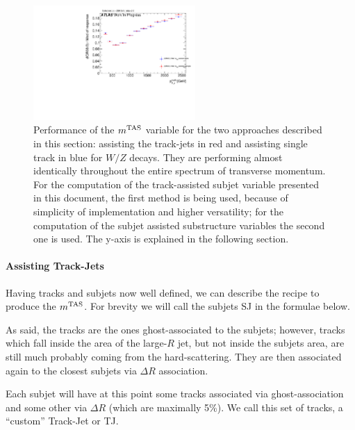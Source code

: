 \begin{figure}[!ht]
  \centering
      \includegraphics[width=0.55\textwidth]{jet_part/71graphcftr_h_JetRatio_mJ12CALOIQRoMwsecondApproach.pdf}
  \caption[Equivalence of approaches]{Performance of the $m^\textrm{TAS}$ variable for the two approaches described in this section: assisting the track-jets in red and assisting single track in blue for $W/Z$ decays. They are performing almost identically throughout the entire spectrum of transverse momentum. For the computation of the track-assisted subjet variable presented in this document, the first method is being used, because of simplicity of implementation and higher versatility; for the computation of the subjet assisted substructure variables the second one is used. The y-axis is explained in the following section.}
  \label{fig:sascha}
\end{figure}


\paragraph{Assisting Track-Jets}
\label{sec:mtas}
Having tracks and subjets now well defined, we can describe the recipe to produce the $m^\textrm{TAS}$. For brevity we will call the subjets SJ in the formulae below. 

As said, the tracks are the ones ghost-associated to the subjets; however, tracks which fall inside the area of the large-$R$ jet, but not inside the subjets area, are still much probably coming from the hard-scattering. They are then associated again to the closest subjets via $\Delta R$ association.

Each subjet will have at this point some tracks associated via ghost-association and some other via $\Delta R$ (which are maximally 5\%). We call this set of tracks, a ``custom'' Track-Jet or TJ.

